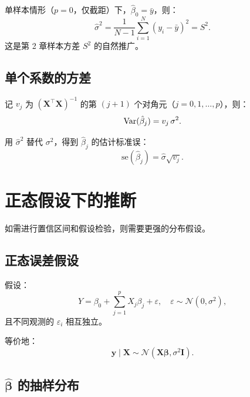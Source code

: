 \begin{remark}[与第 2 章 $S^2$ 的联系]
单样本情形（$p=0$，仅截距）下，$\hat{\beta}_0 = \bar{y}$，则：
\[
    \hat{\sigma}^2 = \frac{1}{N-1} \sum_{i=1}^{N} (y_i - \bar{y})^2 = S^2.
\]
这是第 2 章样本方差 $S^2$ 的自然推广。
\end{remark}

\subsection{单个系数的方差}

记 $v_j$ 为 $(\mathbf{X}^\top \mathbf{X})^{-1}$ 的第 $(j+1)$ 个对角元（$j = 0, 1, \dots, p$），则：
\begin{equation}\label{eq:beta_j_var}
    \mathrm{Var}(\hat{\beta}_j) = v_j \,\sigma^2.
\end{equation}

用 $\hat{\sigma}^2$ 替代 $\sigma^2$，得到 $\hat{\beta}_j$ 的估计标准误：
\begin{equation}\label{eq:beta_j_se}
    \mathrm{se}(\hat{\beta}_j) = \hat{\sigma} \sqrt{v_j}.
\end{equation}

\section{正态假设下的推断}

如需进行置信区间和假设检验，则需要更强的分布假设。

\subsection{正态误差假设}

\begin{definition}[带正态误差的线性模型]
假设：
\begin{equation}\label{eq:normal_model}
    Y = \beta_0 + \sum_{j=1}^{p} X_j \beta_j + \varepsilon,
    \quad \varepsilon \sim \mathcal{N}(0, \sigma^2),
\end{equation}
且不同观测的 $\varepsilon_i$ 相互独立。
\end{definition}

等价地：
\begin{equation}\label{eq:y_normal}
    \mathbf{y} \mid \mathbf{X} \sim \mathcal{N}(\mathbf{X}\bm{\beta}, \sigma^2 \mathbf{I}).
\end{equation}

\subsection{$\hat{\bm{\beta}}$ 的抽样分布}

